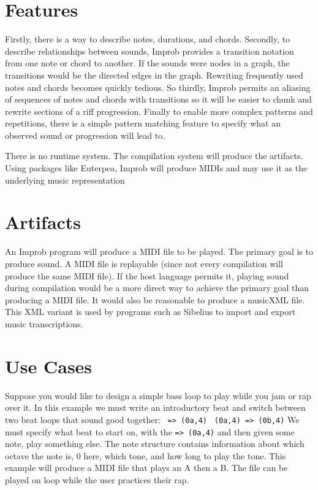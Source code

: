 \documentclass{article}
\begin{document}
\section{Features}
Firstly, there is a way to describe notes, durations, and chords. Secondly, to describe relationships between sounds, Improb provides a transition notation from one note or chord to another. If the sounds were nodes in a graph, the transitions would be the directed edges in the graph. Rewriting frequently used notes and chords becomes quickly tedious. So thirdly, Improb permits an aliasing of sequences of notes and chords with transitions so it will be easier to chunk and rewrite sections of a riff progression. Finally to enable more complex patterns and repetitions, there is a simple pattern matching feature to specify what an observed sound or progression will lead to.

There is no runtime system. The compilation system will produce the artifacts. Using packages like Euterpea, Improb will produce MIDIs and may use it as the underlying music representation

\section{Artifacts}
An Improb program will produce a MIDI file to be played. The primary goal is to produce sound. A MIDI file is replayable (since not every compilation will produce the same MIDI file). If the host language permits it, playing sound during compilation would be a more direct way to achieve the primary goal than producing a MIDI file. It would also be reasonable to produce a musicXML file. This XML variant is used by programs such as Sibelius to import and export music transcriptions.

\section{Use Cases}

Suppose you would like to design a simple bass loop to play while you jam or rap over it. In this example we must write an introductory beat and switch between two beat loops that sound good together: \newline
\texttt{ => (0a,4)} \newline
\texttt{ (0a,4) => (0b,4)} \newline
We must specify what beat to start on, with the \texttt{=> (0a,4)} and then given some note, play something else. The note structure contains information about which octave the note is, 0 here, which tone, and how long to play the tone. This example will produce a MIDI file that plays an A then a B. The file can be played on loop while the user practices their rap.
\newline
\end{document}
